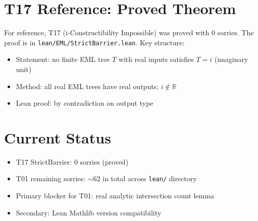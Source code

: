 \documentclass[11pt]{article}
\begin{document}
\section{T17 Reference: Proved Theorem}

For reference, T17 (i-Constructibility Impossible) was proved with 0 sorries.
The proof is in \texttt{lean/EML/StrictBarrier.lean}. Key structure:
\begin{itemize}
\item Statement: no finite EML tree $T$ with real inputs satisfies $T = i$ (imaginary unit)
\item Method: all real EML trees have real outputs; $i \notin \mathbb{R}$
\item Lean proof: by contradiction on output type
\end{itemize}

\section{Current Status}

\begin{itemize}
\item T17 StrictBarrier: 0 sorries (proved)
\item T01 remaining sorries: $\sim 62$ in total across \texttt{lean/} directory
\item Primary blocker for T01: real analytic intersection count lemma
\item Secondary: Lean Mathlib version compatibility
\end{itemize}
\end{document}
